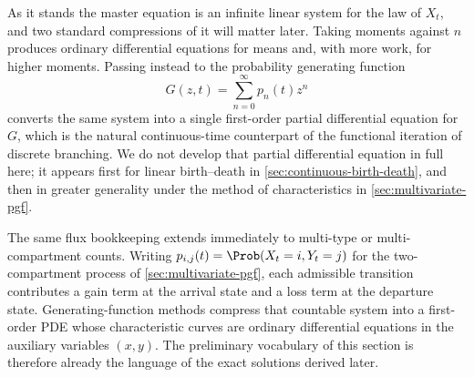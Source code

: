 As it stands the master equation is an infinite linear system for the law of $X_t$, and two standard compressions of it will matter later.  Taking moments against $n$ produces ordinary differential equations for means and, with more work, for higher moments.  Passing instead to the probability generating function
\[
  G(z,t)=\sum_{n=0}^{\infty}p_n(t)z^n
\]
converts the same system into a single first-order partial differential equation for $G$, which is the natural continuous-time counterpart of the functional iteration of discrete branching.  We do not develop that partial differential equation in full here; it appears first for linear birth--death in \cref{sec:continuous-birth-death}, and then in greater generality under the method of characteristics in \cref{sec:multivariate-pgf}.

The same flux bookkeeping extends immediately to multi-type or multi-compartment counts.  Writing $p_{i,j}(t)=\Prob(X_t=i,Y_t=j)$ for the two-compartment process of \cref{sec:multivariate-pgf}, each admissible transition contributes a gain term at the arrival state and a loss term at the departure state.  Generating-function methods compress that countable system into a first-order PDE whose characteristic curves are ordinary differential equations in the auxiliary variables $(x,y)$.  The preliminary vocabulary of this section is therefore already the language of the exact solutions derived later.

